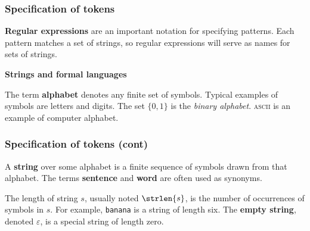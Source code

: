% 
\begin{frame}
\frametitle{Specification of tokens}

\textbf{Regular expressions} are an important notation for specifying
patterns. Each pattern matches a set of strings, so regular
expressions will serve as names for sets of strings.

\bigskip

\textbf{Strings and formal languages}

\bigskip

The term \textbf{alphabet} denotes any finite set of symbols. Typical
examples of symbols are letters and digits. The set \(\{0, 1\}\) is
the \emph{binary alphabet}. \textsc{ascii} is an example of computer
alphabet.

\end{frame}

% 
\begin{frame}
\frametitle{Specification of tokens (cont)}

A \textbf{string} over some alphabet is a finite sequence of symbols
drawn from that alphabet. The terms \textbf{sentence}
and \textbf{word} are often used as synonyms. 

\bigskip

The length of string \(s\), usually noted \(\strlen{s}\), is the
number of occurrences of symbols in \(s\). For
example, \texttt{banana} is a string of length six. The \textbf{empty
string}, denoted \(\varepsilon\), is a special string of length zero.

\end{frame}

